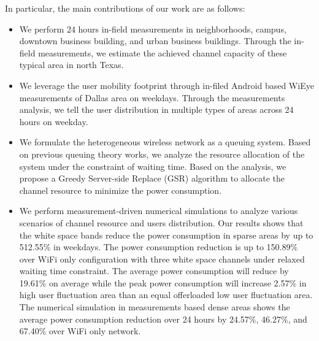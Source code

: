 In particular, the main contributions of our work are as follows:
\begin{itemize}
\item We perform 24 hours in-field measurements in neighborhoods, campus, downtown business building, and urban business buildings. Through the in-field measurements, we estimate the achieved channel capacity of these typical area in north Texas.
\item We leverage the user mobility footprint through in-filed Android based WiEye measurements of Dallas area on weekdays. Through the measurements analysis, we tell the user distribution in multiple types of areas across 24 hours on weekday. 
\item We formulate the heterogeneous wireless network as a queuing system. Based on previous queuing theory works, we analyze the resource allocation of the system under the constraint of waiting time. Based on the analysis, we propose a Greedy Server-side Replace (GSR) algorithm to allocate the channel resource to minimize the power consumption.
\item We perform measurement-driven numerical simulations to analyze various scenarios of channel resource and users distribution. Our results shows that the white space bands reduce the power consumption in sparse areas by up to 512.55\% in weekdays. 
The power consumption reduction is up to 150.89\% over WiFi only configuration with three white space channels under relaxed waiting time constraint.
The average power consumption will reduce by 19.61\% on average while the peak power consumption will increase 2.57\% in high user fluctuation area than an equal offerloaded low user fluctuation area.
The numerical simulation in measurements based dense areas shows the average power consumption reduction over 24 hours by 24.57\%, 46.27\%, and 67.40\% over WiFi only network. 
\end{itemize}

